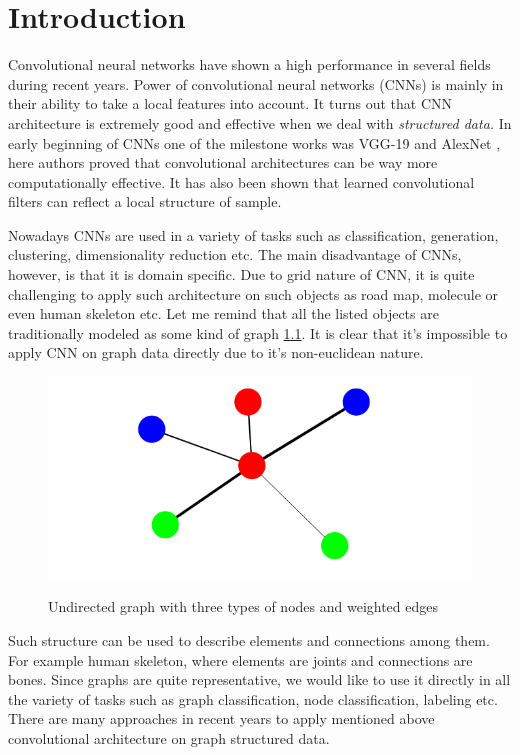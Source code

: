 \chapter{Introduction}

Convolutional neural networks have shown a high performance in several fields during recent years. Power of convolutional neural networks (CNNs) is mainly in their ability to take a local features into account. It turns out that CNN architecture is extremely good and effective when we deal with \textit{structured data.} In early beginning of CNNs one of the milestone works was VGG-19 \cite{Simonyan_Zisserman_2015} and AlexNet \cite{Krizhevsky_Sutskever_Hinton_2017}, here authors proved that convolutional architectures can be way more computationally effective. It has also been shown that learned convolutional filters can reflect a local structure of sample.

Nowadays CNNs are used in a variety of tasks such as classification, generation, clustering, dimensionality reduction etc. The main disadvantage of CNNs, however, is that it is domain specific. Due to grid nature of CNN, it is quite challenging to apply such architecture on such objects as road map, molecule or even human skeleton etc. Let me remind that all the listed objects are traditionally modeled as some kind of graph \ref{fig:1}. It is clear that it's impossible to apply CNN on graph data directly due to it's non-euclidean nature.

\begin{figure}[!h]
    \centering
    \caption[width=\textwidth]{Undirected graph with three types of nodes and weighted edges}
    \includegraphics{figure/graph.png}
    \label{fig:1}
\end{figure}

Such structure can be used to describe elements and connections among them. For example human skeleton, where elements are joints and connections are bones. Since graphs are quite representative, we would like to use it directly in all the variety of tasks such as graph classification, node classification, labeling etc. There are many approaches in recent years to apply mentioned above convolutional architecture on graph structured data.

